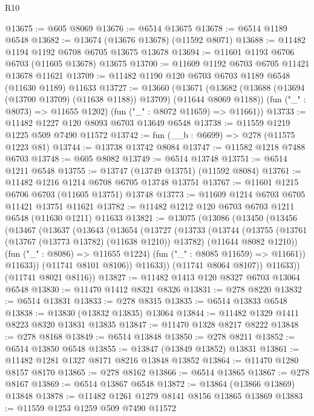 \begin{lexlean}{R10}
\begin{coremodule}
{{{{{{{{{{{{{{{{{{{{{{{{{{{{{{{{{{{{{{{{{{{{{{{{{{{{{{{{{{{{{{{{{{{{{{{{{{{{{{{{{{{{@13675 := @605 @8069
@13676 := @6514 @13675
@13678 := @6514 @1189 @6548
@13682 := @13674 (@13676 @13678) (@11592 @8071)
@13688 := @11482 @1194 @1192 @6708 @6705 @13675 @13678
@13694 := @11601 @1193 @6706 @6703 (@11605 @13678) @13675
@13700 := @11609 @1192 @6703 @6705 @11421 @13678 @11621
@13709 := @11482 @1190 @120 @6703 @6703 @1189 @6548 (@11630 @1189) @11633
@13727 := @13660
    (@13671
      (@13682 (@13688 (@13694 (@13700 @13709) (@11638 @1188)) @13709) (@11644 @8069 @1188))
      (fun ("_" : @8073) => @11655 @1202)
      (fun ("_" : @8072 @11659) => @11661))
@13733 := @11482 @1227 @120 @8093 @6703 @13649 @6548
@13738 := @11559 @1219 @1225 @509 @7490 @11572
@13742 := fun (__b : @6699) => @278 (@11575 @1223 @81)
@13744 := @13738 @13742 @8084
@13747 := @11582 @1218 @7488 @6703
@13748 := @605 @8082
@13749 := @6514 @13748
@13751 := @6514 @1211 @6548
@13755 := @13747 (@13749 @13751) (@11592 @8084)
@13761 := @11482 @1216 @1214 @6708 @6705 @13748 @13751
@13767 := @11601 @1215 @6706 @6703 (@11605 @13751) @13748
@13773 := @11609 @1214 @6703 @6705 @11421 @13751 @11621
@13782 := @11482 @1212 @120 @6703 @6703 @1211 @6548 (@11630 @1211) @11633
@13821 := @13075
    (@13086
      (@13450
        (@13456
          (@13467
            (@13637
              (@13643
                (@13654
                  (@13727
                    (@13733
                      (@13744
                        (@13755
                          (@13761 (@13767 (@13773 @13782) (@11638 @1210)) @13782)
                          (@11644 @8082 @1210))
                        (fun ("_" : @8086) => @11655 @1224)
                        (fun ("_" : @8085 @11659) => @11661))
                      @11633))
                  (@11741 @8101 @8106))
                @11633))
            (@11741 @8064 @8107))
          @11633))
      (@11741 @8021 @8116))
@13827 := @11482 @1413 @120 @8327 @6703 @13064 @6548
@13830 := @11470 @1412 @8321 @8326
@13831 := @278 @8220
@13832 := @6514 @13831
@13833 := @278 @8315
@13835 := @6514 @13833 @6548
@13838 := @13830 (@13832 @13835) @13064
@13844 := @11482 @1329 @1411 @8223 @8320 @13831 @13835
@13847 := @11470 @1328 @8217 @8222
@13848 := @278 @8168
@13849 := @6514 @13848
@13850 := @278 @8211
@13852 := @6514 @13850 @6548
@13855 := @13847 (@13849 @13852) @13831
@13861 := @11482 @1281 @1327 @8171 @8216 @13848 @13852
@13864 := @11470 @1280 @8157 @8170
@13865 := @278 @8162
@13866 := @6514 @13865
@13867 := @278 @8167
@13869 := @6514 @13867 @6548
@13872 := @13864 (@13866 @13869) @13848
@13878 := @11482 @1261 @1279 @8141 @8156 @13865 @13869
@13883 := @11559 @1253 @1259 @509 @7490 @11572
}}}}}}}}}}}}}}}}}}}}}}}}}}}}}}}}}}}}}}}}}}}}}}}}}}}}}}}}}}}}}}}}}}}}}}}}}}}}}}}}}}}}
\end{coremodule}
\end{lexlean}
